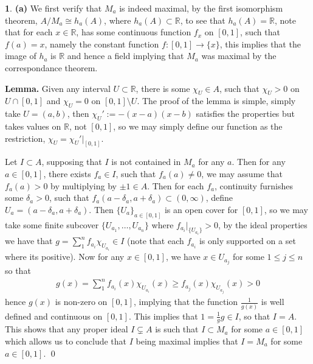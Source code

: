 \documentclass[11pt]{article}
\theoremstyle{definition}
\newtheorem{pb}{}
\newcommand{\set}[1]{\{#1\}}
\begin{document}
    \begin{pb}
        \textbf{(a)} We first verify that \(M_a\) is indeed maximal, by the first isomorphism theorem, \(A/M_a \cong h_a(A)\), where \(h_a(A) \subset \mathbb{R}\), to see that \(h_a(A) = \mathbb{R}\), note that for each \(x \in \mathbb{R}\), has some continuous function \(f_x\) on \([0,1]\), such that \(f(a) = x\), namely the constant function \(f : [0,1] \to \set{x}\), this implies that the image of \(h_a\) is \(\mathbb{R}\) and hence a field implying that \(M_a\) was maximal by the correspondance theorem.
        
        \textbf{Lemma.} Given any interval \(U \subset \mathbb{R}\), there is some \(\chi_U \in A\), such that \(\chi_U > 0\) on \(U \cap[0,1]\) and \(\chi_U = 0\) on \([0,1] \setminus U\). The proof of the lemma is simple, simply take \(U = (a,b)\), then \(\chi_U' := -(x-a)(x-b)\) satisfies the properties but takes values on \(\mathbb{R}\), not \([0,1]\), so we may simply define our function as the restriction, \(\chi_U = \chi_U' \vert_{[0,1]}\).

        Let \(I \subset A\), supposing that \(I\) is not contained in \(M_a\) for any \(a\). Then for any \(a \in [0,1]\), there exists \(f_a \in I\), such that \(f_a(a) \neq 0\), we may assume that \(f_a(a) > 0\) by multiplying by \(\pm1 \in A\). Then for each \(f_a\), continuity furnishes some \(\delta_a > 0\), such that \(f_a(a-\delta_a,a+\delta_a) \subset (0,\infty)\), define \(U_a = (a - \delta_a,a+\delta_a)\). Then \(\set{U_a}_{a\in[0,1]}\) is an open cover for \([0,1]\), so we may take some finite subcover \(\set{U_{a_1},\hdots,U_{a_n}}\) where \(f_{a_i}\vert_{\set{U_{a_i}}} > 0\), by the ideal properties we have that \(g = \sum_1^nf_{a_i}\chi_{U_{a_i}} \in I\) (note that each \(f_{a_i}\) is only supported on a set where its positive). Now for any \(x \in [0,1]\), we have \(x \in U_{a_j}\) for some \(1 \leq j \leq n\) so that
        \begin{align*}
            g(x) = \sum_1^nf_{a_i}(x)\chi_{U_{a_i}}(x) \geq f_{a_j}(x)\chi_{U_{a_j}}(x) > 0
        \end{align*}
        hence \(g(x)\) is non-zero on \([0,1]\), implying that the function \(\frac{1}{g(x)}\) is well defined and continuous on \([0,1]\). This implies that \(1 = \frac{1}{g}g \in I\), so that \(I = A\). This shows that any proper ideal \(I \subsetneq A\) is such that \(I \subset M_a\) for some \(a \in [0,1]\) which allows us to conclude that \(I\) being maximal implies that \(I = M_a\) for some \(a \in [0,1]\). \qed


\end{pb}
\end{document}
